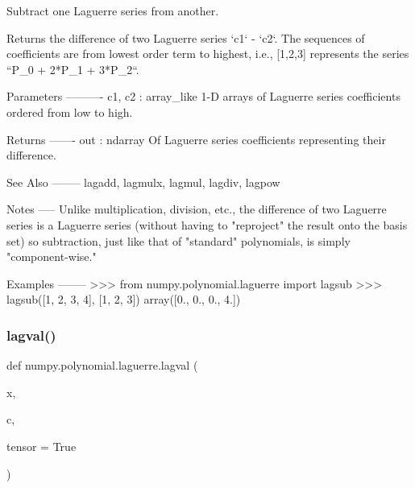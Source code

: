 \begin{DoxyVerb}Subtract one Laguerre series from another.

Returns the difference of two Laguerre series `c1` - `c2`.  The
sequences of coefficients are from lowest order term to highest, i.e.,
[1,2,3] represents the series ``P_0 + 2*P_1 + 3*P_2``.

Parameters
----------
c1, c2 : array_like
    1-D arrays of Laguerre series coefficients ordered from low to
    high.

Returns
-------
out : ndarray
    Of Laguerre series coefficients representing their difference.

See Also
--------
lagadd, lagmulx, lagmul, lagdiv, lagpow

Notes
-----
Unlike multiplication, division, etc., the difference of two Laguerre
series is a Laguerre series (without having to "reproject" the result
onto the basis set) so subtraction, just like that of "standard"
polynomials, is simply "component-wise."

Examples
--------
>>> from numpy.polynomial.laguerre import lagsub
>>> lagsub([1, 2, 3, 4], [1, 2, 3])
array([0.,  0.,  0.,  4.])\end{DoxyVerb}
 \mbox{\label{namespacenumpy_1_1polynomial_1_1laguerre_ae0391215cc88c31e22aa27485d51f5f4}} 
\subsubsection{\texorpdfstring{lagval()}{lagval()}}
{\footnotesize\ttfamily def numpy.\+polynomial.\+laguerre.\+lagval (\begin{DoxyParamCaption}\item[{}]{x,  }\item[{}]{c,  }\item[{}]{tensor = {\ttfamily True} }\end{DoxyParamCaption})}

